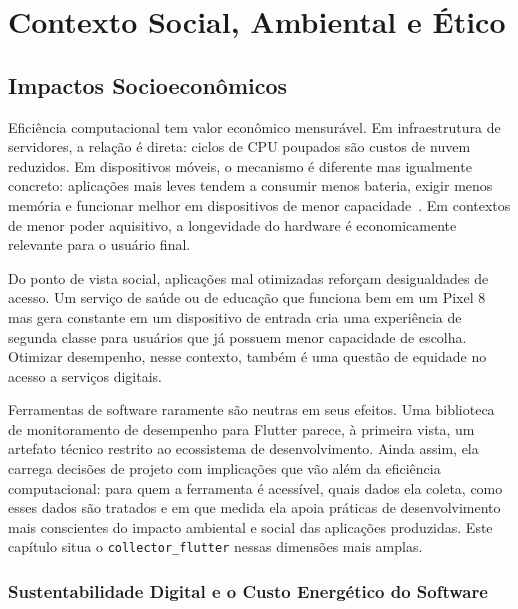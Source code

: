 
\chapter{Contexto Social, Ambiental e Ético}
\section{Impactos Socioeconômicos}

Eficiência computacional tem valor econômico mensurável. Em infraestrutura de servidores, a relação é direta: ciclos de CPU poupados são custos de nuvem reduzidos. Em dispositivos móveis, o mecanismo é diferente mas igualmente concreto: aplicações mais leves tendem a consumir menos bateria, exigir menos memória e funcionar melhor em dispositivos de menor capacidade~\cite{hoque2015energy,rua2024largescale}. Em contextos de menor poder aquisitivo, a longevidade do hardware é economicamente relevante para o usuário final.

Do ponto de vista social, aplicações mal otimizadas reforçam desigualdades de acesso. Um serviço de saúde ou de educação que funciona bem em um Pixel 8 mas gera \jank{} constante em um dispositivo de entrada cria uma experiência de segunda classe para usuários que já possuem menor capacidade de escolha. Otimizar desempenho, nesse contexto, também é uma questão de equidade no acesso a serviços digitais.

Ferramentas de software raramente são neutras em seus efeitos. Uma biblioteca de monitoramento de desempenho para Flutter parece, à primeira vista, um artefato técnico restrito ao ecossistema de desenvolvimento. Ainda assim, ela carrega decisões de projeto com implicações que vão além da eficiência computacional: para quem a ferramenta é acessível, quais dados ela coleta, como esses dados são tratados e em que medida ela apoia práticas de desenvolvimento mais conscientes do impacto ambiental e social das aplicações produzidas. Este capítulo situa o \texttt{collector\_flutter} nessas dimensões mais amplas.

\subsection*{Sustentabilidade Digital e o Custo Energético do Software}

